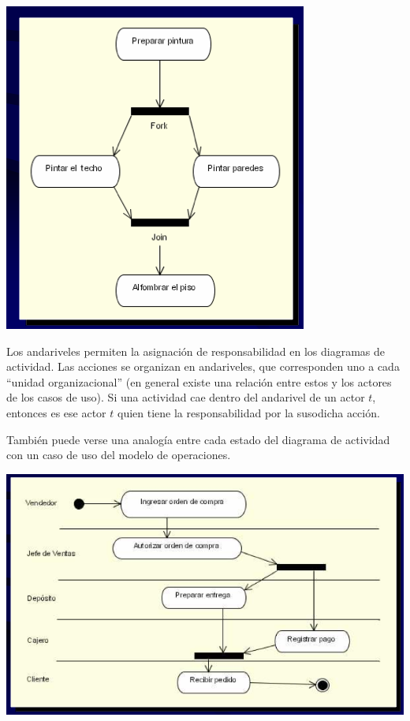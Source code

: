 \documentclass[]{article}
\begin{document}
\begin{center}
	\includegraphics[scale=0.5]{ForkJoin.png}
\end{center}

Los andariveles permiten la asignación de responsabilidad en los diagramas de actividad. Las acciones se organizan en andariveles, que corresponden uno a cada ``unidad organizacional'' (en general existe una relación entre estos y los actores de los casos de uso). Si una actividad cae dentro del andarivel de un actor $t$, entonces es ese actor $t$ quien tiene la responsabilidad por la susodicha acción.

También puede verse una analogía entre cada estado del diagrama de actividad con un caso de uso del modelo de operaciones.


\begin{center}
	\includegraphics[scale=0.5]{Andariveles.png}
\end{center}
\end{document}
